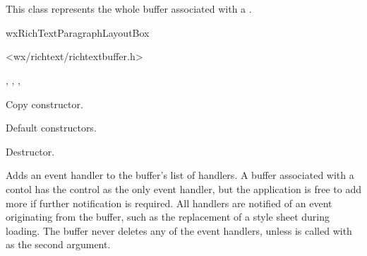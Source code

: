 \section{}\label{wxrichtextbuffer}

This class represents the whole buffer associated with a .


wxRichTextParagraphLayoutBox


<wx/richtext/richtextbuffer.h>





, , , 


\label{wxrichtextbufferwxrichtextbuffer}


Copy constructor.


Default constructors.

\label{wxrichtextbufferdtor}


Destructor.

\label{wxrichtextbufferaddeventhandler}


Adds an event handler to the buffer's list of handlers. A buffer associated with
a contol has the control as the only event handler, but the application is free
to add more if further notification is required. All handlers are notified
of an event originating from the buffer, such as the replacement of a style sheet
during loading. The buffer never deletes any of the event handlers, unless 
 is
called with \true as the second argument.


